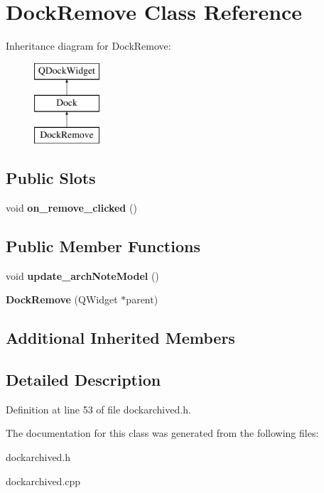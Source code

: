 \hypertarget{class_dock_remove}{}\section{Dock\+Remove Class Reference}
\label{class_dock_remove}
Inheritance diagram for Dock\+Remove\+:\begin{figure}[H]
\begin{center}
\leavevmode
\includegraphics[height=3.000000cm]{class_dock_remove}
\end{center}
\end{figure}
\subsection*{Public Slots}
\begin{DoxyCompactItemize}
\item 
\mbox{\label{class_dock_remove_af674d9505592df25cd5b08328c0cdbd6}} 
void {\bfseries on\+\_\+remove\+\_\+clicked} ()
\end{DoxyCompactItemize}
\subsection*{Public Member Functions}
\begin{DoxyCompactItemize}
\item 
\mbox{\label{class_dock_remove_a4e653c9a21161b7d76c9cfd330579047}} 
void {\bfseries update\+\_\+arch\+Note\+Model} ()
\item 
\mbox{\label{class_dock_remove_aa2665bd1459600d9346029df9f2bba27}} 
{\bfseries Dock\+Remove} (Q\+Widget $\ast$parent)
\end{DoxyCompactItemize}
\subsection*{Additional Inherited Members}


\subsection{Detailed Description}


Definition at line 53 of file dockarchived.\+h.



The documentation for this class was generated from the following files\+:\begin{DoxyCompactItemize}
\item 
dockarchived.\+h\item 
dockarchived.\+cpp\end{DoxyCompactItemize}
